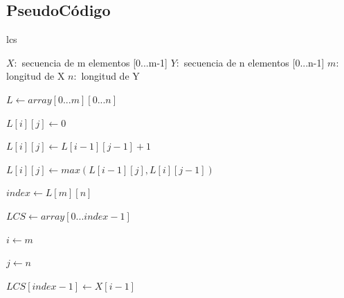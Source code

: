\documentclass{article}
\begin{document}
	\subsection{PseudoCódigo}

		\begin{algorithm}[H]

			\caption{lcs}

			\label{lcs}

			\begin{algorithmic}[1] %

				\State $X:$ secuencia de m elementos [0...m-1]
				\State $Y:$ secuencia de n elementos [0...n-1]
				\State $m:$ longitud de X
				\State $n:$ longitud de Y
				\State

				\State $L \gets array[0...m][0...n]$
				\State





							\State $L[i][j]\gets 0$


 							\State $L[i][j]\gets L[i-1][j-1] + 1$

						\Else

 							\State $L[i][j]\gets max(L[i-1][j], L[i][j-1])$

						\EndIf

					\EndFor

				\EndFor

				\State

				\State $index \gets L[m][n]$
										
				\State $LCS \gets array[0...index-1]$
				\State

				\State $i \gets m$
				
				\State $j \gets n$
		
				
   				
						\State $LCS[index-1]\gets X[i-1]$
				

\end{algorithmic}
\end{algorithm}
\end{document}

